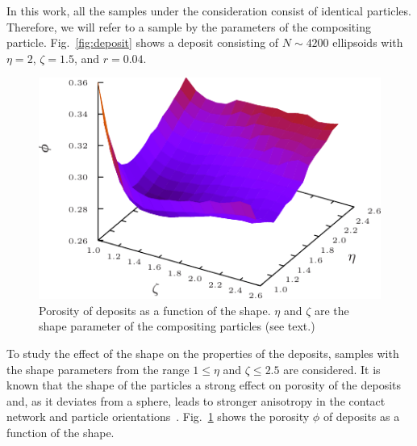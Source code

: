 \documentclass[aps,twocolumn,superscriptaddress,showpacs,showkeys]{revtex4-1}
\begin{document}
In this work, all the samples under the consideration consist of identical
particles. Therefore, we will refer to a sample by the parameters of the
compositing particle. Fig.~\ref{fig:deposit} shows a deposit consisting of
$N \sim 4200$ ellipsoids with $\eta=2$, $\zeta=1.5$, and $r=0.04$.
%
\begin{figure}
\includegraphics*[width=1.0\columnwidth]{data-figs/porosity}
\caption{
\label{fig:porosity}
Porosity of deposits as a function of the shape. $\eta$ and $\zeta$ are the
shape parameter of the compositing particles (see text.)
}
\end{figure}
%

To study the effect of the shape on the properties of the deposits, samples
with the shape parameters from the range $1 \le \eta$ and $\zeta \le 2.5$ are
considered. It is known that the shape of the particles a strong effect on
porosity of the deposits and, as it deviates from a sphere, leads to stronger
anisotropy in the contact network and particle
orientations~\cite{bib:reza-pedro2011}. Fig.~\ref{fig:porosity} shows the
porosity $\phi$ of deposits as a function of the shape.

\end{document}
